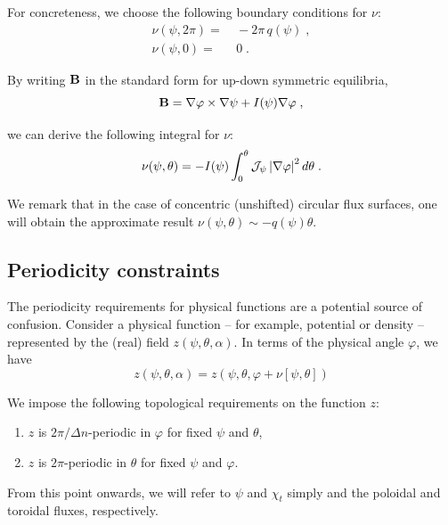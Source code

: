 \noindent
For concreteness, we choose the following boundary conditions 
for $\nu$:
%
\begin{align}
\nu(\psi,2\pi) = &~-2\pi \, q(\psi) 
\label{eq.qdef} \; , \\
\nu(\psi,0)    = &~0 \; .
\end{align}

\noindent
By writing $\mathbf{B}$ in the standard form for up-down symmetric 
equilibria, 
%
\begin{equation}
\mathbf{B} = \nabla\varphi\times\nabla\psi + I(\psi) \nabla\varphi \; ,
\end{equation}

\noindent
we can derive the following integral for $\nu$:
%
\begin{equation}
\nu(\psi,\theta) = -I(\psi)\int_0^\theta 
{\mathcal J}_\psi \left|\nabla\varphi\right|^2 d\theta\; .
\label{eq.nu}
\end{equation}

\noindent
We remark that in the case of concentric (unshifted) circular 
flux surfaces, one will obtain the approximate result 
$\nu(\psi,\theta) \sim -q(\psi)\theta$. 

\subsection{Periodicity constraints}\label{sec.period}

The periodicity requirements for physical functions are 
a potential source of confusion.  Consider a physical 
function -- for example, potential or density -- represented 
by the (real) field $z(\psi,\theta,\alpha)$.  In terms 
of the physical angle $\varphi$, we have
%
\begin{equation}
z(\psi,\theta,\alpha) = z\left(\psi,\theta,\varphi + \nu[\psi,\theta]\right) 
\end{equation}

\noindent
We impose the following topological requirements on the function $z$:

\begin{enumerate}
\item
$z$ is $2\pi/\Delta n$-periodic in $\varphi$ for fixed $\psi$ and $\theta$,
\item
$z$ is $2\pi$-periodic in $\theta$ for fixed $\psi$ and $\varphi$.
\end{enumerate}

\noindent
From this point onwards, we will refer to $\psi$ and $\chi_t$ simply 
and the poloidal and toroidal fluxes, respectively.

